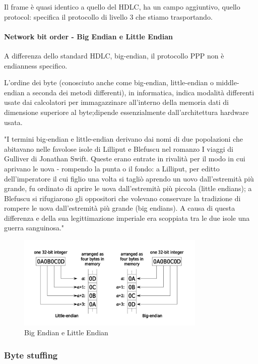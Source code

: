 Il frame è quasi identico a quello del HDLC, ha un campo aggiuntivo, quello protocol: specifica il protocollo di livello 3 che stiamo trasportando.

\paragraph{Network bit order - Big Endian e Little Endian}
A differenza dello standard HDLC, big-endian, il protocollo PPP non è endianness specifico.

L'ordine dei byte (conosciuto anche come big-endian, little-endian o middle-endian a seconda dei metodi differenti), in informatica, indica modalità differenti usate dai calcolatori per immagazzinare all'interno della memoria dati di dimensione superiore al byte;dipende essenzialmente dall'architettura hardware usata.

"I termini big-endian e little-endian derivano dai nomi di due popolazioni che abitavano nelle favolose isole di Lilliput e Blefuscu nel romanzo I viaggi di Gulliver di Jonathan Swift. Queste erano entrate in rivalità per il modo in cui aprivano le uova - rompendo la punta o il fondo: a Lilliput, per editto dell'imperatore il cui figlio una volta si tagliò aprendo un uovo dall'estremità più grande, fu ordinato di aprire le uova dall'estremità più piccola (little endians); a Blefuscu si rifugiarono gli oppositori che volevano conservare la tradizione di rompere le uova dall'estremità più grande (big endians). A causa di questa differenza e della sua legittimazione imperiale era scoppiata tra le due isole una guerra sanguinosa."

\begin{figure}[htbp]
    \centering
    \includegraphics[width=0.8\textwidth]{images/endian.png}
    \caption{Big Endian e Little Endian}
    \label{fig:endian}
\end{figure}
\newpage

    \subsubsection{Byte stuffing}


